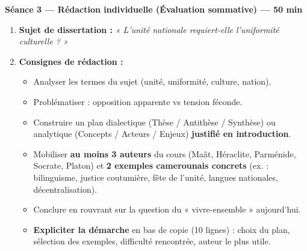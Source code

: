 \documentclass[11pt]{article}
\begin{document}
\textbf{Séance 3 — Rédaction individuelle (Évaluation sommative) — 50 min}
\begin{enumerate}
    \item \textbf{Sujet de dissertation :} \emph{« L'unité nationale requiert-elle l'uniformité culturelle ? »}
    \item \textbf{Consignes de rédaction :}
    \begin{itemize}
        \item Analyser les termes du sujet (unité, uniformité, culture, nation).
        \item Problématiser : opposition apparente vs tension féconde.
        \item Construire un plan dialectique (Thèse / Antithèse / Synthèse) ou analytique (Concepts / Acteurs / Enjeux) \textbf{justifié en introduction}.
        \item Mobiliser \textbf{au moins 3 auteurs} du cours (Maât, Héraclite, Parménide, Socrate, Platon) et \textbf{2 exemples camerounais concrets} (ex. : bilinguisme, justice coutumière, fête de l'unité, langues nationales, décentralisation).
        \item Conclure en rouvrant sur la question du « vivre-ensemble » aujourd'hui.
        \item \textbf{Expliciter la démarche} en bas de copie (10 lignes) : choix du plan, sélection des exemples, difficulté rencontrée, auteur le plus utile.
    \end{itemize}
\end{enumerate}
\end{document}

